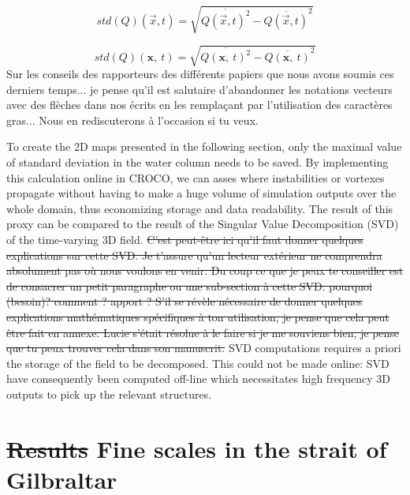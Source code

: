   \color{green}\begin{equation} 
\label{eqstdQ} 
    std ( Q ) (\vec{x},t)=  \sqrt{   \overline{Q (\vec{x},t)^{2}} -  \overline{Q(\vec{x},t)}^{2}  }
\end{equation}

 \color{blue}\begin{equation} 
\label{eqstdQ} 
    std ( Q ) (\mathbf{x},\ t)=  \sqrt{   \overline{Q (\mathbf{x},\ t)^{2}} -  \overline{Q(\mathbf{x},\ t)}^{2}  }
\end{equation}
 \color{green}Sur les conseils des rapporteurs des différents papiers que nous avons soumis ces derniers temps... je pense qu'il est salutaire d'abandonner les notations vecteurs avec des flèches dans nos écrits en les remplaçant par l'utilisation des caractères gras... Nous en rediscuterons à l'occasion si tu veux. \color{black}

To create the 2D maps presented in the following section, only the maximal value of standard deviation in the water column \color{blue}needs to be saved.
By implementing this calculation online in CROCO, we can asses where instabilities or vortexes propagate without having to make a huge volume of simulation outputs over the whole domain, thus economizing storage and data readability. \color{black}
The result of this proxy can be compared to the result of the Singular Value Decomposition (SVD) of the time-varying 3D field.  \sout{C'est peut-être ici qu'il faut donner quelques explications sur cette SVD. Je t'assure qu'un lecteur extérieur ne comprendra absolument pas où nous voulons en venir. Du coup ce que je peux te conseiller est de consacrer un petit paragraphe ou une sub-section à cette SVD: pourquoi (besoin)? comment ? apport ? S'il se révèle nécessaire de donner quelques explications mathématiques spécifiques à ton utilisation, je pense que cela peut être fait en annexe. Lucie s'était résolue à le faire si je me souviens bien, je pense que tu peux trouver cela dans son manuscrit.} \color{black}
 \color{blue}SVD computations requires a priori the storage of the field to be decomposed. This could not be made online: SVD have consequently been computed off-line which necessitates high frequency 3D outputs to pick up the relevant structures. \color{black}

\section{\sout{Results} Fine scales in the strait of Gilbraltar}
\label{section3DRes}

